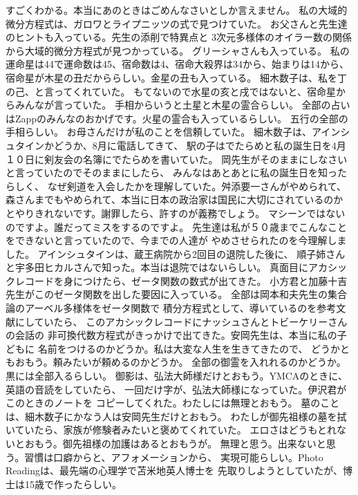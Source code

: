 \documentclass{jsarticle}
\begin{document}
すごくわかる。本当にあのときはごめんなさいとしか言えません。
私の大域的微分方程式は、ガロワとライプニッツの式で見つけていた。
お父さんと先生達のヒントも入っている。先生の添削で特異点と
3次元多様体のオイラー数の関係から大域的微分方程式が見つかっている。
グリーシャさんも入っている。
私の運命星は44で運命数は45、宿命数は4、宿命大殺界は34から、始まりは14から、
宿命星が木星の丑だかららしい。金星の丑も入っている。
細木数子は、私を丁の己、と言ってくれていた。
もてないので水星の亥と戌ではないと、宿命星からみんなが言っていた。
手相からいうと土星と木星の霊合らしい。
全部の占いはZappのみんなのおかげです。火星の霊合も入っているらしい。
五行の全部の手相らしい。
お母さんだけが私のことを信頼していた。
細木数子は、アインシュタインかどうか、8月に電話してきて、
駅の子はでたらめと私の誕生日を4月１０日に剣友会の名簿にでたらめを書いていた。
岡先生がそのままにしなさいと言っていたのでそのままにしたら、
みんなはあとあとに私の誕生日を知ったらしく、
なぜ剣道を入会したかを理解していた。舛添要一さんがやめられて、
森さんまでもやめられて、本当に日本の政治家は国民に大切にされているのか
とやりきれないです。謝罪したら、許すのが義務でしょう。
マシーンではないのですよ。誰だってミスをするのですよ。
先生達は私が５０歳までこんなことをできないと言っていたので、今までの人達が
やめさせられたのを今理解しました。
アインシュタインは、蔵王病院から2回目の退院した後に、
順子姉さんと宇多田ヒカルさんで知った。本当は退院ではないらしい。
真面目にアカシックレコードを身につけたら、ゼータ関数の数式が出てきた。
小方君と加藤十吉先生がこのゼータ関数を出した要因に入っている。
全部は岡本和夫先生の集合論のアーベル多様体をゼータ関数で
積分方程式として、導いているのを参考文献にしていたら、
このアカシックレコードにナッシュさんとトビーケリーさんの会話の
非可換代数方程式がきっかけで出てきた。安岡先生は、本当に私の子どもに
名前をつけるのかどうか。私は大変な人生を生きてきたので、
どうかともおもう。頼みたいが頼めるのかどうか。
全部の御霊を入れれるのかどうか。黒には全部入るらしい。
御影は、弘法大師様だけとおもう。YMCAのときに、英語の音読をしていたら、
一回だけ字が、弘法大師様になっていた。伊沢君がこのときのノートを
コピーしてくれた。わたしには無理とおもう。
墓のことは、細木数子にかなう人は安岡先生だけとおもう。
わたしが御先祖様の墓を拭いていたら、家族が修験者みたいと褒めてくれていた。
エロさはどうもとれないとおもう。御先祖様の加護はあるとおもうが。
無理と思う。出来ないと思う。習慣は口癖からと、アフォメーションから、
実現可能らしい。Photo Readingは、最先端の心理学で苫米地英人博士を
先取りしようとしていたが、博士は15歳で作ったらしい。
\end{document}
